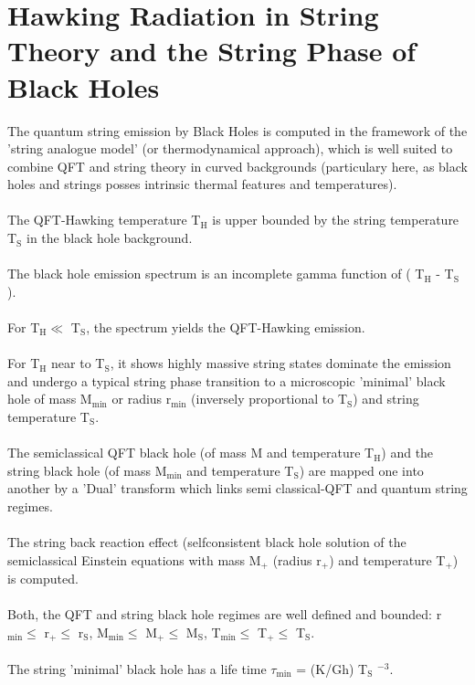 \documentclass[12pt,a4paper]{article}
\begin{document}
\section{Hawking Radiation in String Theory and the String Phase of Black 
Holes}
The quantum string emission by Black Holes is computed in the framework of the 
'string analogue model' (or thermodynamical approach), which is well suited to 
combine QFT and string theory in curved backgrounds (particulary here, as black 
holes and strings posses intrinsic thermal features and temperatures).\\ \\
The QFT-Hawking temperature T$_{\mathrm{H}}$ is upper bounded by the string 
temperature T$_{\mathrm{S}}$ in the black hole background.\\ \\
The black hole emission spectrum is an incomplete gamma function of (
T$_{\mathrm{H}}$ - T$_{\mathrm{S}}$).\\ \\
For T$_{\mathrm{H}} \ll$ T$_{\mathrm{S}}$, the spectrum yields the QFT-Hawking emission.\\ \\
For T$_{\mathrm{H}}$ near to T$_{\mathrm{S}}$, it shows highly massive string 
states dominate the emission and undergo a typical string phase transition to 
a microscopic 'minimal' black hole of mass M$_{\mathrm{min}}$ or radius 
r$_{\mathrm{min}}$ (inversely proportional to T$_{\mathrm{S}}$) and string 
temperature T$_{\mathrm{S}}$.\\ \\
The semiclassical QFT black hole (of mass M and temperature T$_{\mathrm{H}}$) 
and the string black hole (of mass M$_{\mathrm{min}}$ and temperature T$_{\mathrm{S}}$) are mapped one into another by a 'Dual' transform which links 
semi classical-QFT and quantum string regimes.\\ \\
The string back reaction effect (selfconsistent black hole solution of the 
semiclassical Einstein equations with mass M$_{+}$ (radius r$_{+}$) and temperature T$_{+}$) is computed.\\ \\
Both, the QFT and string black hole regimes are well defined and bounded:  
r$_{\mathrm{min}} \le$ r$_{+} \le$ r$_{\mathrm{S}}$, 
M$_{\mathrm{min}} \le$ M$_{+} \le$ M$_{\mathrm{S}}$, 
T$_{\mathrm{min}} \le$ T$_{+} \le$ T$_{\mathrm{S}}$.\\ \\
The string 'minimal' black hole has a life time 
$\tau _{\mathrm{min}}$ = (K/Gh) T$_{\mathrm{S}}$ $^{-3}$. \\
\end{document}
